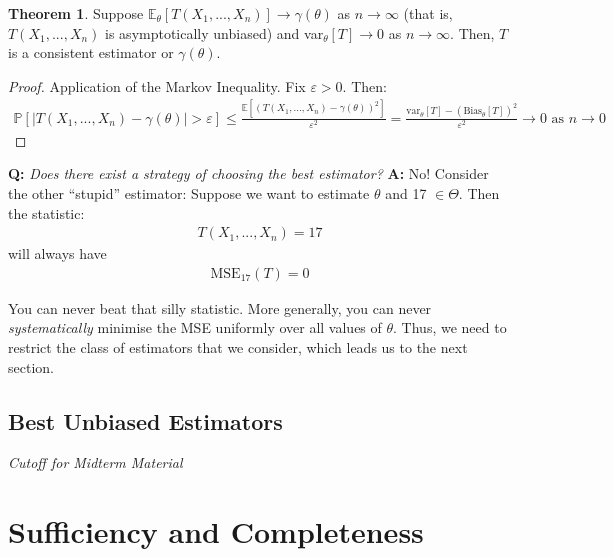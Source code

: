 \documentclass[11pt]{scrartcl}
\theoremstyle{definition}
\newtheorem{theorem}{Theorem}
\theoremstyle{remark}
\newcommand{\pr}[1]{\mathbb{P}[#1]}
\newcommand{\stat}[0]{T(X_1, ..., X_n )}
\newcommand{\EX}[1]{\mathbb{E}\left[#1 \right]}
\newcommand{\EXth}[1]{\mathbb{E}_\theta \left[ #1 \right]}
\begin{document}
\begin{theorem}
	Suppose $\EXth{\stat} \rightarrow \gamma(\theta)$ as $n \rightarrow \infty$ (that is, $\stat$ is asymptotically unbiased) and var$_\theta[T] \rightarrow 0$ as $n \rightarrow \infty$. Then, $T$ is a consistent estimator or $\gamma(\theta)$. 
\end{theorem}

\begin{proof} Application of the Markov Inequality. Fix $\varepsilon > 0$. Then: 
\begin{align*}
	\pr{ | \stat - \gamma(\theta) | > \varepsilon} \leq \frac{\EX{ (\stat - \gamma(\theta))^2}}{\varepsilon^2} = \frac{\text{var}_\theta [T] - (\text{Bias}_\theta[T])^2}{\varepsilon^2}	 \rightarrow 0 \text{ as } n \rightarrow 0 
\end{align*}
	
\end{proof}

\textbf{Q:} \emph{Does there exist a strategy of choosing the best estimator?} \textbf{A:} No! Consider the other ``stupid'' estimator: Suppose we want to estimate $\theta$ and 17 $\in \Theta$. Then the statistic: 
\begin{align*}
	\stat = 17	
\end{align*}
will always have
\begin{align*}
\text{MSE}_{17}(T) = 0 	
\end{align*}

 You can never beat that silly statistic. More generally, you can never \emph{systematically} minimise the MSE uniformly over all values of $\theta$. Thus, we need to restrict the class of estimators that we consider, which leads us to the next section. 

\subsection{Best Unbiased Estimators}


\emph{Cutoff for Midterm Material} 
\section{Sufficiency and Completeness} 
\end{document}
